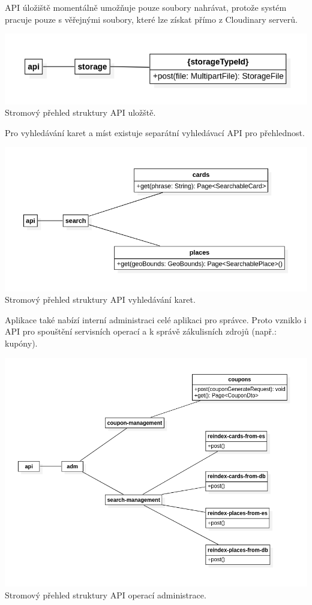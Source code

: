 		\ac{API} úložiště momentálně umožňuje pouze soubory nahrávat, protože systém pracuje pouze s věřejnými soubory, které
		lze získat přímo z Cloudinary serverů.

		\includegraphics{obrazky/api_model_uloziste}\hfill
		Stromový přehled struktury API uložště. %

		Pro vyhledávání karet a míst existuje separátní vyhledávací \ac{API} pro přehlednost.

		\includegraphics{obrazky/api_model_vyhledavani}\hfill
		Stromový přehled struktury API vyhledávání karet. %

		Aplikace také nabízí interní administraci celé aplikaci pro správce.
		Proto vzniklo i \ac{API} pro spouštění servisních operací a k správě zákulisních zdrojů (např.: kupóny).

		\includegraphics{obrazky/api_model_adm}\hfill
		Stromový přehled struktury API operací administrace. %


